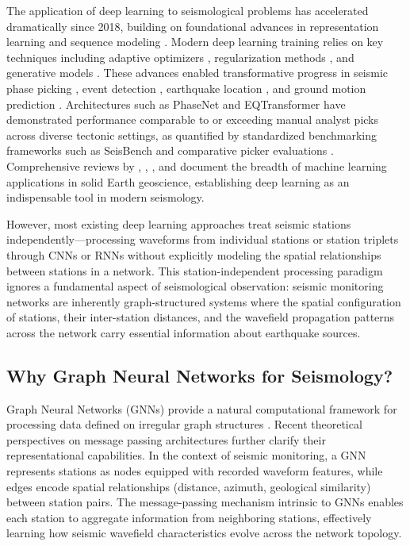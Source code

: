 \documentclass[review,authoryear]{elsarticle}
\begin{document}
The application of deep learning to seismological problems has accelerated dramatically since 2018, building on foundational advances in representation learning \citep{lecun2015deep, krizhevsky2012imagenet, he2016deep} and sequence modeling \citep{hochreiter1997long, graves2013speech, schuster1997bidirectional}. Modern deep learning training relies on key techniques including adaptive optimizers \citep{kingma2015adam}, regularization methods \citep{srivastava2014dropout, ioffe2015batch}, and generative models \citep{goodfellow2014generative, kingma2014auto}. These advances enabled transformative progress in seismic phase picking \citep{ross2018generalized, zhu2019phasenet, mousavi2020earthquake}, event detection \citep{perol2018convolutional, yoon2015earthquake}, earthquake location \citep{kriegerowski2019deep, lomax2012automatic}, and ground motion prediction \citep{derras2014towards}. Architectures such as PhaseNet \citep{zhu2019phasenet} and EQTransformer \citep{mousavi2020earthquake} have demonstrated performance comparable to or exceeding manual analyst picks across diverse tectonic settings, as quantified by standardized benchmarking frameworks such as SeisBench \citep{woollam2022seisbench} and comparative picker evaluations \citep{munchmeyer2022picker}. Comprehensive reviews by \citet{bergen2019machine}, \citet{kong2019machine}, \citet{mousavi2022deep}, and \citet{mousavi2023review} document the breadth of machine learning applications in solid Earth geoscience, establishing deep learning as an indispensable tool in modern seismology.

However, most existing deep learning approaches treat seismic stations independently---processing waveforms from individual stations or station triplets through CNNs or RNNs without explicitly modeling the spatial relationships between stations in a network. This station-independent processing paradigm ignores a fundamental aspect of seismological observation: seismic monitoring networks are inherently graph-structured systems where the spatial configuration of stations, their inter-station distances, and the wavefield propagation patterns across the network carry essential information about earthquake sources.

\subsection{Why Graph Neural Networks for Seismology?}

Graph Neural Networks (GNNs) provide a natural computational framework for processing data defined on irregular graph structures \citep{scarselli2009graph, bronstein2017geometric, wu2021comprehensive, zhang2020deep}. Recent theoretical perspectives on message passing architectures \citep{velivckovic2022message} further clarify their representational capabilities. In the context of seismic monitoring, a GNN represents stations as nodes equipped with recorded waveform features, while edges encode spatial relationships (distance, azimuth, geological similarity) between station pairs. The message-passing mechanism intrinsic to GNNs enables each station to aggregate information from neighboring stations, effectively learning how seismic wavefield characteristics evolve across the network topology.
\end{document}
